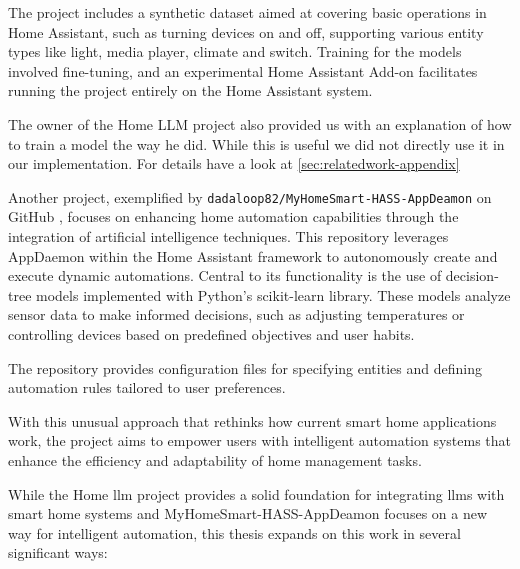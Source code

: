 The project includes a synthetic dataset aimed at covering basic operations in Home Assistant, such as turning devices on and off, supporting various entity types like light, media player, climate and switch. Training for the models involved fine-tuning, and an experimental Home Assistant Add-on facilitates running the project entirely on the Home Assistant system.

The owner of the Home LLM project also provided us with an explanation of how to train a model the way he did. While this is useful we did not directly use it in our implementation. For details have a look at \cref{sec:relatedwork-appendix}

Another project, exemplified by \texttt{dadaloop82/MyHomeSmart-HASS-AppDeamon} on GitHub \cite{dadaloop82_MyHomeSmart_HASS_AppDeamon}, focuses on enhancing home automation capabilities through the integration of artificial intelligence techniques. This repository leverages AppDaemon within the Home Assistant framework to autonomously create and execute dynamic automations. Central to its functionality is the use of decision-tree models implemented with Python's scikit-learn library. These models analyze sensor data to make informed decisions, such as adjusting temperatures or controlling devices based on predefined objectives and user habits.

The repository provides configuration files for specifying entities and defining automation rules tailored to user preferences.

With this unusual approach that rethinks how current smart home applications work, the project aims to empower users with intelligent automation systems that enhance the efficiency and adaptability of home management tasks.

While the Home \gls{llm} project provides a solid foundation for integrating \glspl{llm} with smart home systems and MyHomeSmart-HASS-AppDeamon focuses on a new way for intelligent automation, this thesis expands on this work in several significant ways:

